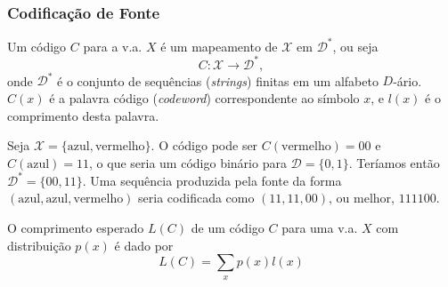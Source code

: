 \begin{frame}[allowframebreaks]
  \frametitle{Codificação de Fonte}
  \begin{definition}
  Um código $C$ para a v.a. $X$ é um mapeamento de $\mathcal{X}$ em $\mathcal{D}^\ast$, 
  ou seja 
	\begin{equation} 
	C: \mathcal{X} \rightarrow \mathcal{D}^\ast , 
	\end{equation} 
  onde $\mathcal{D}^\ast$ é o conjunto
  de sequências (\textit{strings}) finitas em um alfabeto $D$-ário. $C(x)$ é a palavra código 
  (\textit{codeword}) correspondente ao símbolo $x$, e $l(x)$ é o comprimento desta palavra.
  \end{definition}

  \begin{example}
  Seja $\mathcal{X} = \{\text{azul}, \text{vermelho}\}$. O código pode ser $C(\text{vermelho})=00$ e 
  $C(\text{azul})=11$, o que seria um código binário para $\mathcal{D} = \{0,1\}$.
  Teríamos então $\mathcal{D}^\ast = \{ 00 , 11 \}$. Uma sequência produzida pela fonte da forma
  $(\text{azul},\text{azul},\text{vermelho})$ seria codificada como $(11,11,00)$, ou melhor, $111100$.
  \end{example}

  \framebreak

  \begin{definition}
  O comprimento esperado $L(C)$ de um código $C$ para uma v.a. $X$ com distribuição $p(x)$ é dado por
	\begin{equation}
	L(C) = \sum_x p(x) l(x)
	\end{equation}
  \end{definition}

  \framebreak


\end{frame}
